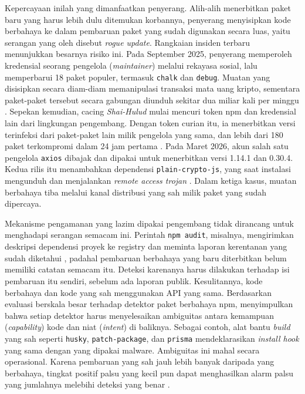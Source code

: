 \documentclass[a4paper,fleqn]{cas-dc}
\begin{document}
Kepercayaan inilah yang dimanfaatkan penyerang. Alih-alih menerbitkan paket baru
yang harus lebih dulu ditemukan korbannya, penyerang menyisipkan kode berbahaya
ke dalam pembaruan paket yang sudah digunakan secara luas, yaitu serangan yang
oleh \citet{sofaer2024rogueone} disebut \emph{rogue update}. Rangkaian insiden
terbaru menunjukkan besarnya risiko ini. Pada September 2025, penyerang
memperoleh kredensial seorang pengelola (\emph{maintainer}) melalui rekayasa
sosial, lalu memperbarui 18 paket populer, termasuk \texttt{chalk} dan
\texttt{debug}. Muatan yang disisipkan secara diam-diam memanipulasi transaksi
mata uang kripto, sementara paket-paket tersebut secara gabungan diunduh sekitar
dua miliar kali per minggu \citep{aws2025chalk}. Sepekan kemudian, cacing
\emph{Shai-Hulud} mulai mencuri token npm dan kredensial lain dari lingkungan
pengembang. Dengan token curian itu, ia menerbitkan versi terinfeksi dari
paket-paket lain milik pengelola yang sama, dan lebih dari 180 paket
terkompromi dalam 24 jam pertama \citep{aws2025chalk,unit42shaihulud}. Pada Maret
2026, akun salah satu pengelola \texttt{axios} dibajak dan dipakai untuk
menerbitkan versi 1.14.1 dan 0.30.4. Kedua rilis itu menambahkan dependensi
\texttt{plain-crypto-js}, yang saat instalasi mengunduh dan menjalankan
\emph{remote access trojan} \citep{datadog2026axios}. Dalam ketiga kasus, muatan
berbahaya tiba melalui kanal distribusi yang sah milik paket yang sudah
dipercaya.

Mekanisme pengamanan yang lazim dipakai pengembang tidak dirancang untuk
menghadapi serangan semacam ini. Perintah \texttt{npm audit}, misalnya,
mengirimkan deskripsi dependensi proyek ke registry dan meminta laporan
kerentanan yang sudah diketahui \citep{npmaudit}, padahal pembaruan berbahaya
yang baru diterbitkan belum memiliki catatan semacam itu. Deteksi karenanya
harus dilakukan terhadap isi pembaruan itu sendiri, sebelum ada laporan publik.
Kesulitannya, kode berbahaya dan kode yang sah menggunakan API yang sama.
Berdasarkan evaluasi berskala besar terhadap detektor paket berbahaya npm,
\citet{guo2026effective} menyimpulkan bahwa setiap detektor harus menyelesaikan
ambiguitas antara kemampuan (\emph{capability}) kode dan niat (\emph{intent}) di
baliknya. Sebagai contoh, alat bantu \emph{build} yang sah seperti
\texttt{husky}, \texttt{patch-package}, dan \texttt{prisma} mendeklarasikan
\emph{install hook} yang sama dengan yang dipakai malware. Ambiguitas ini mahal
secara operasional. Karena pembaruan yang sah jauh lebih banyak daripada yang
berbahaya, tingkat positif palsu yang kecil pun dapat menghasilkan alarm palsu
yang jumlahnya melebihi deteksi yang benar \citep{wyss2025evaluating}.
\end{document}
